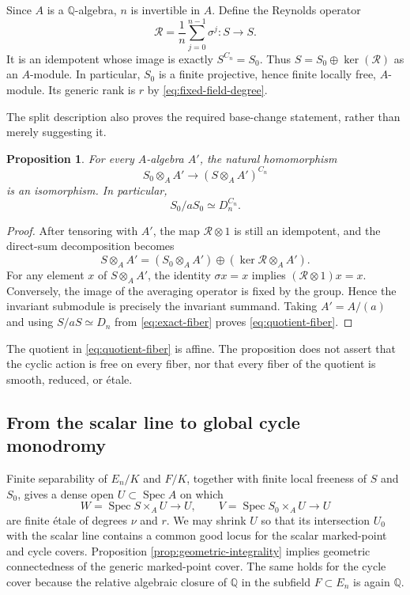 \documentclass[11pt]{article}
\newtheorem{proposition}[theorem]{Proposition}
\theoremstyle{definition}
\theoremstyle{remark}
\newcommand{\Q}{\mathbb{Q}}
\newcommand{\Spec}{\operatorname{Spec}}
\newcommand{\etale}{\'{e}tale}
\newcommand{\cR}{\mathcal{R}}
\begin{document}
Since $A$ is a $\Q$-algebra, $n$ is invertible in $A$.  Define the Reynolds
operator
\begin{equation}\label{eq:reynolds}
 \cR=\frac{1}{n}\sum_{j=0}^{n-1}\sigma^j:S\longrightarrow S.
\end{equation}
It is an idempotent whose image is exactly $S^{C_n}=S_0$.  Thus
$S=S_0\oplus\ker(\cR)$ as an $A$-module.  In particular, $S_0$ is a finite
projective, hence finite locally free, $A$-module.  Its generic rank is $r$
by \eqref{eq:fixed-field-degree}.

The split description also proves the required base-change statement, rather
than merely suggesting it.

\begin{proposition}\label{prop:invariants-base-change}
For every $A$-algebra $A'$, the natural homomorphism
\[
 S_0\otimes_AA'\longrightarrow(S\otimes_AA')^{C_n}
\]
is an isomorphism.  In particular,
\begin{equation}\label{eq:quotient-fiber}
 S_0/aS_0\simeq D_n^{C_n}.
\end{equation}
\end{proposition}

\begin{proof}
After tensoring with $A'$, the map $\cR\otimes1$ is still an idempotent,
and the direct-sum decomposition becomes
\[
 S\otimes_AA'=(S_0\otimes_AA')\oplus(\ker\cR\otimes_AA').
\]
For any element $x$ of $S\otimes_AA'$, the identity
$\sigma x=x$ implies $(\cR\otimes1)x=x$.  Conversely, the image of the
averaging operator is fixed by the group.  Hence the invariant submodule is
precisely the invariant summand.  Taking $A'=A/(a)$ and using
$S/aS\simeq D_n$ from \eqref{eq:exact-fiber} proves
\eqref{eq:quotient-fiber}.
\end{proof}

The quotient in \eqref{eq:quotient-fiber} is affine.  The proposition does
not assert that the cyclic action is free on every fiber, nor that every
fiber of the quotient is smooth, reduced, or \etale.

\subsection{From the scalar line to global cycle monodromy}

Finite separability of $E_n/K$ and $F/K$, together with finite local
freeness of $S$ and $S_0$, gives a dense open
$U\subset\Spec A$ on which
\[
 W=\Spec S\times_AU\longrightarrow U,
 \qquad
 V=\Spec S_0\times_AU\longrightarrow U
\]
are finite \etale{} of degrees $\nu$ and $r$.  We may shrink $U$ so that
its intersection $U_0$ with the scalar line contains a common good locus for
the scalar marked-point and cycle covers.  Proposition
\ref{prop:geometric-integrality} implies geometric connectedness of the
generic marked-point cover.  The same holds for the cycle cover because the
relative algebraic closure of $\Q$ in the subfield $F\subset E_n$ is again
$\Q$.
\end{document}
